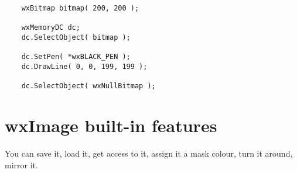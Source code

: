 \begin{verbatim}
    wxBitmap bitmap( 200, 200 );
    
    wxMemoryDC dc;
    dc.SelectObject( bitmap );
    
    dc.SetPen( *wxBLACK_PEN );
    dc.DrawLine( 0, 0, 199, 199 );
    
    dc.SelectObject( wxNullBitmap );
\end{verbatim}

\section{wxImage built-in features}

You can save it, load it, get access to it, assign it a mask colour,
turn it around, mirror it.

